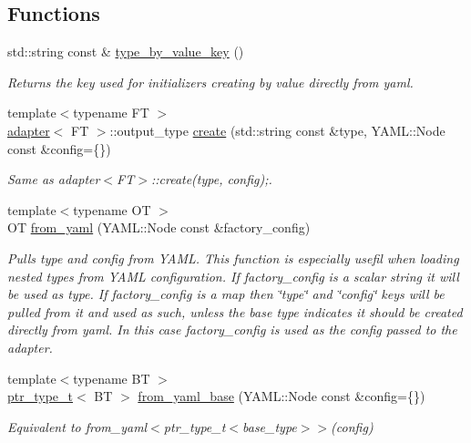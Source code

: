 \subsection*{Functions}
\begin{DoxyCompactItemize}
\item 
std\+::string const  \& \hyperlink{namespaceyadi_a0058efe8131ffa9184aa772e88c8f160}{type\+\_\+by\+\_\+value\+\_\+key} ()
\begin{DoxyCompactList}\small\item\em Returns the key used for initializers creating by value directly from yaml. \end{DoxyCompactList}\item 
{\footnotesize template$<$typename FT $>$ }\\\hyperlink{structyadi_1_1adapter}{adapter}$<$ FT $>$\+::output\+\_\+type \hyperlink{namespaceyadi_ac39d8f532bdf81e833cb117160a6440a}{create} (std\+::string const \&type, Y\+A\+M\+L\+::\+Node const \&config=\{\})
\begin{DoxyCompactList}\small\item\em Same as adapter$<$\+F\+T$>$\+::create(type, config);. \end{DoxyCompactList}\item 
{\footnotesize template$<$typename OT $>$ }\\OT \hyperlink{namespaceyadi_a85138aa0433192beaf4d0e67dd50cb23}{from\+\_\+yaml} (Y\+A\+M\+L\+::\+Node const \&factory\+\_\+config)
\begin{DoxyCompactList}\small\item\em Pulls type and config from Y\+A\+ML. This function is especially usefil when loading nested types from Y\+A\+ML configuration. If factory\+\_\+config is a scalar string it will be used as type. If factory\+\_\+config is a map then \char`\"{}type\char`\"{} and \char`\"{}config\char`\"{} keys will be pulled from it and used as such, unless the base type indicates it should be created directly from yaml. In this case factory\+\_\+config is used as the config passed to the adapter. \end{DoxyCompactList}\item 
{\footnotesize template$<$typename BT $>$ }\\\hyperlink{namespaceyadi_a92290eb27cd90666aa87b17d854af9fe}{ptr\+\_\+type\+\_\+t}$<$ BT $>$ \hyperlink{namespaceyadi_a829744f635593fef1c05b0f9b01a8aa2}{from\+\_\+yaml\+\_\+base} (Y\+A\+M\+L\+::\+Node const \&config=\{\})
\begin{DoxyCompactList}\small\item\em Equivalent to from\+\_\+yaml$<$ptr\+\_\+type\+\_\+t$<$base\+\_\+type$>$$>$(config) \end{DoxyCompactList}\item 

\end{DoxyCompactItemize}
